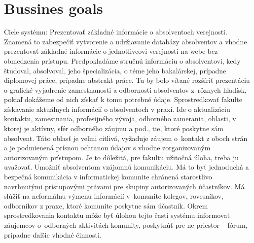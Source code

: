 \documentclass{iitsrc}[2006/14/02]
\begin{document}

\section{Bussines goals}
Ciele systému:
Prezentovať základné informácie o absolventoch verejnosti.
Znamená to zabezpečiť vytvorenie a udržiavanie databázy absolventov a vhodne prezentovať základné informácie o jednotlivcovi verejnosti na webe bez obmedzenia prístupu. Predpokladáme stručnú informáciu o absolventovi, kedy študoval, absolvoval, jeho špecializácia, o téme jeho bakalárskej, prípadne diplomovej práce, prípadne abstrakt práce. Tu by bolo vítané rozšíriť prezentáciu o grafické vyjadrenie zamestnanosti a odbornosti absolventov z rôznych hľadísk, pokiaľ dokážeme od nich získať k tomu potrebné údaje.
Sprostredkovať fakulte získavanie aktuálnych informácií o absolventoch v praxi.
Ide o aktualizáciu kontaktu, zamestnania, profesijného vývoja, odborného zamerania, oblasti, v ktorej je aktívny, sfér odborného záujmu a pod., tie, ktoré poskytne sám absolvent. Táto oblasť je veľmi citlivá, vyžaduje záujem o kontakt z oboch strán a je podmienená prísnou ochranou údajov s vhodne zorganizovaným autorizovaným prístupom. Je to dôležitá, pre fakultu užitočná úloha, treba ju uvažovať.
Umožniť absolventom vzájomnú komunikáciu.
Má to byť jednoduchá a bezpečná komunikácia v informatickej komunite chránená starostlivo navrhnutými prístupovými právami pre skupiny autorizovaných účastníkov. Má slúžiť na neformálnu výmenu informácií v komunite kolegov, rovesníkov, odborníkov z praxe, ktoré komunite poskytne sám účastník. Okrem sprostredkovania kontaktu môže byť úlohou tejto časti systému informovať záujemcov o odborných aktivitách komunity, poskytnúť pre ne priestor – fórum, prípadne ďalšie vhodné činnosti.
\end{document}
